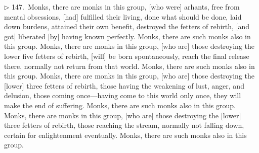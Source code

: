 \addtocounter{sennum}{-4}
$\triangleright$  147.\ Monks, there are monks in this group, [who were] arhants, free from mental obsessions, [had] fulfilled their living, done what should be done, laid down burdens, attained their own benefit, destroyed the fetters of rebirth, [and got] liberated [by] having known perfectly. Monks, there are such monks also in this group.  Monks, there are monks in this group, [who are] those destroying the lower five fetters of rebirth, [will] be born spontaneously, reach the final release there, normally not return from that world. Monks, there are such monks also in this group.  Monks, there are monks in this group, [who are] those destroying the [lower] three fetters of rebirth, those having the weakening of lust, anger, and delusion, those coming once---having come to this world only once, they will make the end of suffering. Monks, there are such monks also in this group.  Monks, there are monks in this group, [who are] those destroying the [lower] three fetters of rebirth, those reaching the stream, normally not falling down, certain for enlightenment eventually. Monks, there are such monks also in this group.\\

